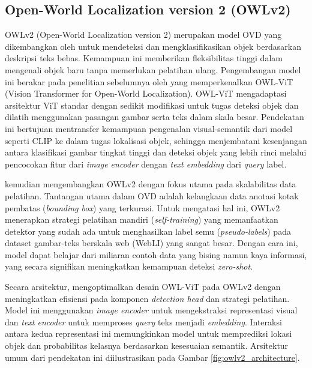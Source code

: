 \subsection{Open-World Localization version 2 (OWLv2)}
OWLv2 (Open-World Localization version 2) merupakan model OVD yang dikembangkan oleh \textcite{mindererScalingOpenVocabularyObject2024} untuk mendeteksi dan mengklasifikasikan objek berdasarkan deskripsi teks bebas. Kemampuan ini memberikan fleksibilitas tinggi dalam mengenali objek baru tanpa memerlukan pelatihan ulang. Pengembangan model ini berakar pada penelitian sebelumnya oleh \textcite{mindererSimpleOpenVocabularyObject2022} yang memperkenalkan OWL-ViT (Vision Transformer for Open-World Localization). OWL-ViT mengadaptasi arsitektur ViT standar dengan sedikit modifikasi untuk tugas deteksi objek dan dilatih menggunakan pasangan gambar serta teks dalam skala besar. Pendekatan ini bertujuan mentransfer kemampuan pengenalan visual-semantik dari model seperti CLIP ke dalam tugas lokalisasi objek, sehingga menjembatani kesenjangan antara klasifikasi gambar tingkat tinggi dan deteksi objek yang lebih rinci melalui pencocokan fitur dari \textit{image encoder} dengan \textit{text embedding} dari \textit{query} label.

\textcite{mindererScalingOpenVocabularyObject2024} kemudian mengembangkan OWLv2 dengan fokus utama pada skalabilitas data pelatihan. Tantangan utama dalam OVD adalah kelangkaan data anotasi kotak pembatas (\textit{bounding box}) yang terkurasi. Untuk mengatasi hal ini, OWLv2 menerapkan strategi pelatihan mandiri (\textit{self-training}) yang memanfaatkan detektor yang sudah ada untuk menghasilkan label semu (\textit{pseudo-labels}) pada dataset gambar-teks berskala web (WebLI) yang sangat besar. Dengan cara ini, model dapat belajar dari miliaran contoh data yang bising namun kaya informasi, yang secara signifikan meningkatkan kemampuan deteksi \textit{zero-shot}.

Secara arsitektur, \textcite{mindererScalingOpenVocabularyObject2024} mengoptimalkan desain OWL-ViT pada OWLv2 dengan meningkatkan efisiensi pada komponen \textit{detection head} dan strategi pelatihan. Model ini menggunakan \textit{image encoder} untuk mengekstraksi representasi visual dan \textit{text encoder} untuk memproses \textit{query} teks menjadi \textit{embedding}. Interaksi antara kedua representasi ini memungkinkan model untuk memprediksi lokasi objek dan probabilitas kelasnya berdasarkan kesesuaian semantik. Arsitektur umum dari pendekatan ini diilustrasikan pada Gambar \ref{fig:owlv2_architecture}.

